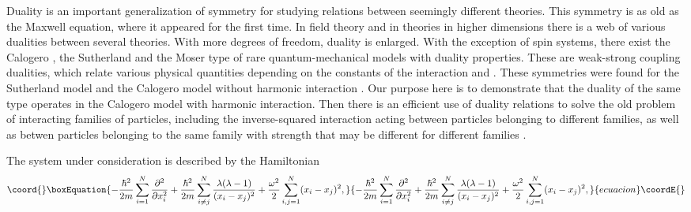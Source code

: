 \documentclass[a4paper,preprint,aps]{revtex4}
\begin{document}
Duality is an important generalization of symmetry for studying relations
 between seemingly different theories. This symmetry is as old as the Maxwell 
equation, where it appeared for the first time. In field theory and in 
theories in higher dimensions there is a web of various dualities between 
several theories. With more degrees of freedom, duality is enlarged. With 
the exception of spin systems, there exist the Calogero \cite{C}, the
 Sutherland \cite{S} and the Moser \cite{M}
 type of rare quantum-mechanical models with duality properties.
 These are weak-strong coupling dualities, which relate various physical
 quantities depending on the constants of the interaction \myHighlight{$\lambda$}\coordHE{} and
 \coordHE{}. These symmetries were found for the Sutherland \cite{G,MP1}
 model and the Calogero model without harmonic interaction \cite{AJ}. Our
 purpose here is to demonstrate that the duality of the same type operates in
 the Calogero model with harmonic interaction. Then there is an efficient
 use of duality relations to solve the old problem of interacting families of
 particles, including the inverse-squared interaction acting between
 particles belonging to different families, as well as betwen particles 
 belonging to the same family with strength that may be different for
 different families \cite{C}.
  
\indent
The system under consideration is described by the Hamiltonian
 \begin{equation}\coord{}\boxEquation{  
	- \frac{\hbar^{2}}{2m} 
	\sum_{i=1}^{N} \frac {\partial ^{2}}{\partial x_{i}^2} +
	\frac{\hbar^{2}}{2m}
	\sum_{i\neq j}^{N} 
	\frac {\lambda(\lambda-1)}{(x_{i}-x_{j})^{2}}+
	\frac{\omega^{2}}{2} \sum_{i,j=1}^{N} (x_{i}-x_{j})^{2},	
}{  
	- \frac{\hbar^{2}}{2m} 
	\sum_{i=1}^{N} \frac {\partial ^{2}}{\partial x_{i}^2} +
	\frac{\hbar^{2}}{2m}
	\sum_{i\neq j}^{N} 
	\frac {\lambda(\lambda-1)}{(x_{i}-x_{j})^{2}}+
	\frac{\omega^{2}}{2} \sum_{i,j=1}^{N} (x_{i}-x_{j})^{2},	
}{ecuacion}\coordE{}\end{equation}
\end{document}
